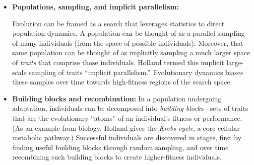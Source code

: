 \documentclass{sig-alternate}
\begin{document}
\begin{itemize}
\item{\bf Populations, sampling, and implicit parallelism:} 

  Evolution can be framed as a search that leverages statistics to
  direct population dynamics.  A population can be thought of as a
  parallel sampling of many individuals (from the space of possible
  individuals).  Moreover, that same population can be thought of as
  implicitly sampling a much larger space of \emph{traits} that
  comprise those individuals.  Holland termed this implicit
  large-scale sampling of traits ``implicit parallelism.''
  Evolutionary dynamics biases these samples over time towards
  high-fitness regions of the search space.


\item{\bf Building blocks and recombination:} 
  In a population undergoing adaptation,
  individuals can be decomposed into \emph{building blocks}---sets of
  traits that are the evolutionary ``atoms'' of an individual's
  fitness or performance. (As an example from biology, Holland gives
  the \emph{Krebs cycle}, a core cellular metabolic
  pathway.)   Successful individuals
  are discovered in stages, first by finding useful
  building blocks through random sampling, and over
  time recombining such building blocks to create higher-fitness individuals. 




\end{itemize}
\end{document}
